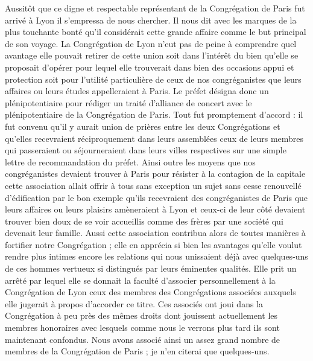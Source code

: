 Aussitôt que ce digne et respectable représentant de la Congrégation de Paris fut arrivé à Lyon il s'empressa de nous chercher. Il nous dit avec les marques de la plus touchante bonté qu'il considérait cette grande affaire comme le but principal de son voyage. La Congrégation de Lyon n'eut pas de peine à comprendre quel avantage elle pouvait retirer de cette union soit dans l'intérêt du bien qu'elle se proposait d'opérer pour lequel elle trouverait dans bien des occasions appui et protection soit pour l'utilité particulière de ceux de nos congréganistes que leurs affaires ou leurs études appelleraient à Paris. Le préfet désigna donc un plénipotentiaire pour rédiger un traité d'alliance de concert avec le plénipotentiaire de la Congrégation de Paris. Tout fut promptement d'accord : il fut convenu qu'il y aurait union de prières entre les deux Congrégations et qu'elles recevraient réciproquement dans leurs assemblées ceux de leurs membres qui passeraient ou séjourneraient dans leurs villes respectives sur une simple lettre de recommandation du préfet. Ainsi outre les moyens que nos congréganistes devaient trouver à Paris pour résister à la contagion de la capitale cette association allait offrir à tous sans exception un sujet sans cesse renouvellé d'édification par le bon exemple qu'ils recevraient des congréganistes de Paris que leurs affaires
ou leurs plaisirs amèneraient à Lyon et ceux-ci de leur côté devaient trouver bien doux de se voir accueillis comme des frères par une société qui devenait leur famille. Aussi cette association contribua alors de toutes manières à fortifier notre Congrégation ; elle en apprécia si bien les avantages qu'elle voulut rendre plus intimes encore les relations qui nous unissaient déjà avec quelques-uns de ces hommes vertueux si distingués par leurs éminentes qualités. Elle prit un arrêté par lequel elle se donnait la faculté d'associer personnellement à la Congrégation de Lyon ceux des membres des Congrégations associées auxquels elle jugerait à propos d'accorder ce titre. Ces associés ont joui dans la Congrégation à peu près des mêmes droits dont jouissent actuellement les membres honoraires avec lesquels comme nous le verrons plus tard ils sont maintenant confondus. Nous avons associé ainsi un assez grand nombre de membres de la Congrégation de Paris ; je n'en citerai que quelques-uns.

